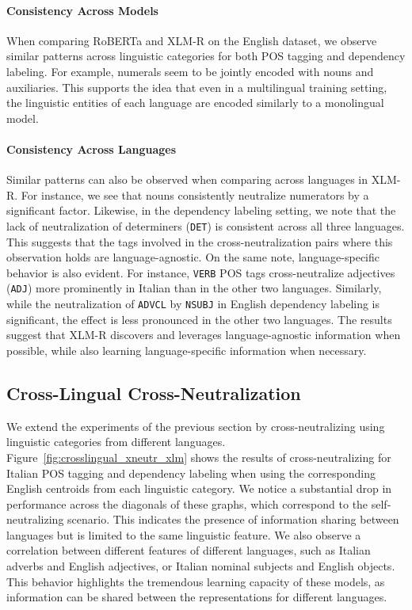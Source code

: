 \documentclass[11pt,a4paper]{article}
\begin{document}
\paragraph{Consistency Across Models}
When comparing RoBERTa and XLM-R on the English dataset, we observe similar patterns across linguistic categories for both POS tagging and dependency labeling. For example, numerals seem to be jointly encoded with nouns and auxiliaries. This supports the idea that even in a multilingual training setting, the linguistic entities of each language are encoded similarly to a monolingual model.

\paragraph{Consistency Across Languages}
Similar patterns can also be observed when comparing across languages in XLM-R. For instance, we see that nouns consistently neutralize numerators by a significant factor. Likewise, in the dependency labeling setting, we note that the lack of neutralization of determiners (\texttt{DET}) is consistent across all three languages. This suggests that the tags involved in the cross-neutralization pairs where this observation holds are language-agnostic. On the same note, language-specific behavior is also evident. For instance, \texttt{VERB} POS tags cross-neutralize adjectives (\texttt{ADJ}) more prominently in Italian than in the other two languages. Similarly, while the neutralization of \texttt{ADVCL} by \texttt{NSUBJ} in English dependency labeling is significant, the effect is less pronounced in the other two languages. The results suggest that XLM-R discovers and leverages language-agnostic information when possible, while also learning language-specific information when necessary.

\subsection{Cross-Lingual Cross-Neutralization}
We extend the experiments of the previous section by cross-neutralizing using linguistic categories from different languages. Figure~\ref{fig:crosslingual_xneutr_xlm} shows the results of cross-neutralizing for Italian POS tagging and dependency labeling when using the corresponding English centroids from each linguistic category. We notice a substantial drop in performance across the diagonals of these graphs, which correspond to the self-neutralizing scenario. This indicates the presence of information sharing between languages but is limited to the same linguistic feature. We also observe a correlation between different features of different languages, such as Italian adverbs and English adjectives, or Italian nominal subjects and English objects. This behavior highlights the tremendous learning capacity of these models, as information can be shared between the representations for different languages.
\end{document}
